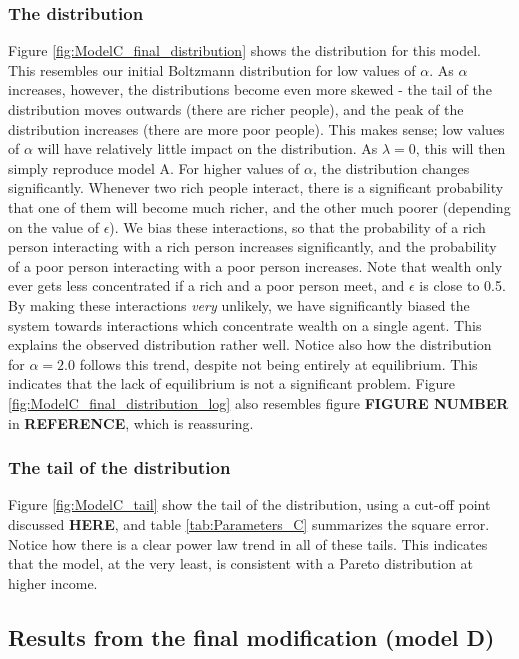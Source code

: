\documentclass[a4paper, 10pt]{article}
\begin{document}
\subsubsection{The distribution}
Figure \ref{fig:ModelC_final_distribution} shows the distribution for this model. This resembles our initial Boltzmann distribution for low values of $\alpha$. As $\alpha$ increases, however, the distributions become even more skewed - the tail of the distribution moves outwards (there are richer people), and the peak of the distribution increases (there are more poor people). This makes sense; low values of $\alpha$ will have relatively little impact on the distribution. As $\lambda=0$, this will then simply reproduce model A. For higher values of $\alpha$, the distribution changes significantly. Whenever two rich people interact, there is a significant probability that one of them will become much richer, and the other much poorer (depending on the value of $\epsilon$). We bias these interactions, so that the probability of a rich person interacting with a rich person increases significantly, and the probability of a poor person interacting with a poor person increases. Note that wealth only ever gets less concentrated if a rich and a poor person meet, and $\epsilon$ is close to 0.5. By making these interactions \textit{very} unlikely, we have significantly biased the system towards interactions which concentrate wealth on a single agent. This explains the observed distribution rather well. Notice also how the distribution for $\alpha=2.0$ follows this trend, despite not being entirely at equilibrium. This indicates that the lack of equilibrium is not a significant problem. Figure \ref{fig:ModelC_final_distribution_log} also resembles figure \textbf{FIGURE NUMBER} in \textbf{REFERENCE}, which is reassuring.
\subsubsection{The tail of the distribution}
Figure \ref{fig:ModelC_tail} show the tail of the distribution, using a cut-off point discussed \textbf{HERE}, and table \ref{tab:Parameters_C} summarizes the square error. Notice how there is a clear power law trend in all of these tails. This indicates that the model, at the very least, is consistent with a Pareto distribution at higher income.

\subsection{Results from the final modification (model D)}
\end{document}
